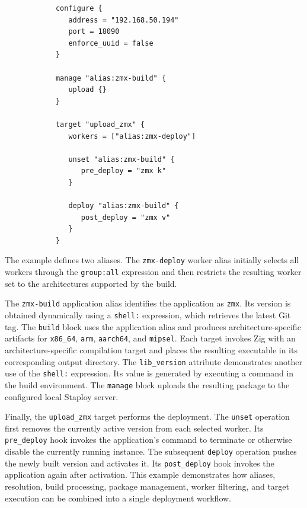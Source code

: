\documentclass[11pt,a4paper]{article}
\begin{document}
\begin{center}
\begin{verbatim}
            configure {
               address = "192.168.50.194"
               port = 18090
               enforce_uuid = false
            }

            manage "alias:zmx-build" {
               upload {}
            }

            target "upload_zmx" {
               workers = ["alias:zmx-deploy"]

               unset "alias:zmx-build" {
                  pre_deploy = "zmx k"
               }

               deploy "alias:zmx-build" {
                  post_deploy = "zmx v"
               }
            }
        \end{verbatim}
    \end{center}

    The example defines two aliases.
    The \texttt{zmx-deploy} worker alias initially selects all workers through the \texttt{group:all} expression and then restricts the resulting worker set to the architectures supported by the build.

    The \texttt{zmx-build} application alias identifies the application as \texttt{zmx}.
    Its version is obtained dynamically using a \texttt{shell:} expression, which retrieves the latest Git tag.
    The \texttt{build} block uses the application alias and produces architecture-specific artifacts for \texttt{x86\_64}, \texttt{arm}, \texttt{aarch64}, and \texttt{mipsel}.
    Each target invokes Zig with an architecture-specific compilation target and places the resulting executable in its corresponding output directory.
    The \texttt{lib\_version} attribute demonstrates another use of the \texttt{shell:} expression.
    Its value is generated by executing a command in the build environment.
    The \texttt{manage} block uploads the resulting package to the configured local Staploy server.

    Finally, the \texttt{upload\_zmx} target performs the deployment.
    The \texttt{unset} operation first removes the currently active version from each selected worker.
    Its \texttt{pre\_deploy} hook invokes the application's command to terminate or otherwise disable the currently running instance.
    The subsequent \texttt{deploy} operation pushes the newly built version and activates it.
    Its \texttt{post\_deploy} hook invokes the application again after activation.
    This example demonstrates how aliases, resolution, build processing, package management, worker filtering, and target execution can be combined into a single deployment workflow.
\end{document}
